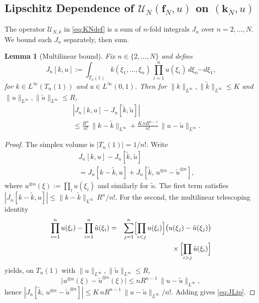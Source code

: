 \documentclass[twocolumn,amsthm]{autart}
\newcommand{\Linf}{L^\infty}
\theoremstyle{plain}
\newtheorem{lemma}{Lemma}
\theoremstyle{definition}
\begin{document}
\subsection{Lipschitz Dependence of $\mathcal{U}_N(\mathbf{f}_N, u)$ on $(\mathbf{k}_N, u)$}
\label{sec:UNlip}

The operator $\mathcal{U}_{N,k}$ in \eqref{eq:KNdef} is a sum of $n$-fold integrals $J_n$ over $n = 2, \ldots, N$. We bound each $J_n$ separately, then sum.

\begin{lemma}[Multilinear bound]
\label{lem:single-order}
Fix $n\in\{2,\ldots,N\}$ and define
\begin{equation}
J_n[k,u] := \int_{T_n(1)} k(\xi_1,\ldots,\xi_n)\,\prod_{i=1}^n u(\xi_i)\,d\xi_n\cdots d\xi_1,
\label{eq:Jdef}
\end{equation}
for $k\in\Linf(T_n(1))$ and $u\in\Linf(0,1)$. Then for $\|k\|_{\Linf},\|\tilde k\|_{\Linf}\le K$ and $\|u\|_{\Linf},\|\tilde u\|_{\Linf}\le R$,
\begin{eqnarray}
&& |J_n[k,u] - J_n[\tilde k,\tilde u]| \nonumber \\
&& \le \frac{R^n}{n!}\,\|k-\tilde k\|_{\Linf}
+ \frac{K\,n R^{n-1}}{n!}\,\|u-\tilde u\|_{\Linf}.
\label{eq:JLip}
\end{eqnarray}
\end{lemma}

\begin{proof}
The simplex volume is $|T_n(1)| = 1/n!$. Write
\begin{eqnarray}
&& J_n[k,u] - J_n[\tilde k,\tilde u] \nonumber \\
&& = J_n[k-\tilde k,u] + J_n[\tilde k,\,u^{\otimes n} - \tilde u^{\otimes n}],
\label{eq:Jdiff-split}
\end{eqnarray}
where $u^{\otimes n}(\xi) := \prod_i u(\xi_i)$ and similarly for $\tilde u$. The first term satisfies $|J_n[k-\tilde k,u]| \le \|k-\tilde k\|_{\Linf}\,R^n / n!$. For the second, the multilinear telescoping identity
\begin{eqnarray}
\prod_{i=1}^n u(\xi_i) - \prod_{i=1}^n \tilde u(\xi_i) &=& \sum_{j=1}^n \Bigl[\prod_{i<j} u(\xi_i)\Bigr]\bigl(u(\xi_j) - \tilde u(\xi_j)\bigr) \nonumber \\
&& \times\, \Bigl[\prod_{i>j}\tilde u(\xi_i)\Bigr]
\label{eq:telescope}
\end{eqnarray}
yields, on $T_n(1)$ with $\|u\|_{\Linf},\|\tilde u\|_{\Linf}\le R$,
\begin{equation}
\bigl|u^{\otimes n}(\xi) - \tilde u^{\otimes n}(\xi)\bigr|
\le n R^{n-1}\,\|u-\tilde u\|_{\Linf},
\label{eq:tensor-diff}
\end{equation}
hence $|J_n[\tilde k,\,u^{\otimes n} - \tilde u^{\otimes n}]| \le K\,n R^{n-1}\,\|u-\tilde u\|_{\Linf} / n!$. Adding gives \eqref{eq:JLip}.
\end{proof}
\end{document}
